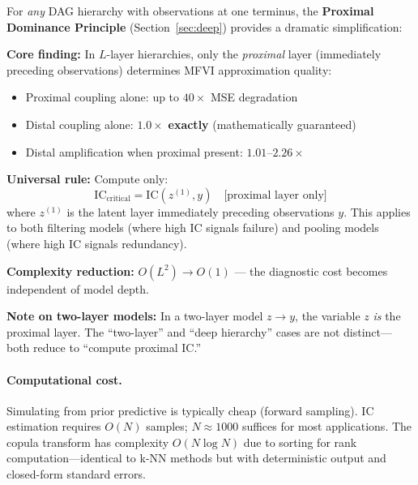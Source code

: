 \documentclass[10pt]{article} %
\theoremstyle{plain}
\theoremstyle{definition}
\newcommand{\IC}{\mathrm{IC}}  %
\begin{document}
\begin{tcolorbox}[breakable, colback=blue!5, colframe=blue!50!black, title=\textbf{Key Simplification: Proximal Dominance}, fonttitle=\bfseries]
For \emph{any} DAG hierarchy with observations at one terminus, the \textbf{Proximal Dominance Principle} (Section~\ref{sec:deep}) provides a dramatic simplification:

\textbf{Core finding:} In $L$-layer hierarchies, only the \emph{proximal} layer (immediately preceding observations) determines MFVI approximation quality:
\begin{itemize}
    \item Proximal coupling alone: up to $40\times$ MSE degradation
    \item Distal coupling alone: $1.0\times$ \textbf{exactly} (mathematically guaranteed)
    \item Distal amplification when proximal present: $1.01$--$2.26\times$
\end{itemize}

\textbf{Universal rule:} Compute only:
\begin{equation*}
\IC_{\text{critical}} = \IC(z^{(1)}, y) \quad \text{[proximal layer only]}
\end{equation*}
where $z^{(1)}$ is the latent layer immediately preceding observations $y$. This applies to both filtering models (where high IC signals failure) and pooling models (where high IC signals redundancy).

\textbf{Complexity reduction:} $O(L^2) \to O(1)$ --- the diagnostic cost becomes independent of model depth.

\textbf{Note on two-layer models:} In a two-layer model $z \to y$, the variable $z$ \emph{is} the proximal layer. The ``two-layer'' and ``deep hierarchy'' cases are not distinct---both reduce to ``compute proximal IC.''
\end{tcolorbox}

\paragraph{Computational cost.} Simulating from prior predictive is typically cheap (forward sampling). IC estimation requires $O(N)$ samples; $N \approx 1000$ suffices for most applications. The copula transform has complexity $O(N \log N)$ due to sorting for rank computation---identical to k-NN methods but with deterministic output and closed-form standard errors.
\end{document}
